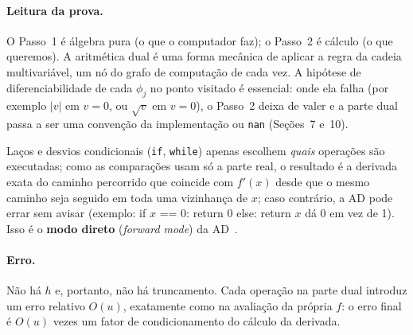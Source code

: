\documentclass[11pt,a4paper]{article}
\begin{document}
\paragraph{Leitura da prova.} O Passo~1 é álgebra pura (o que o computador faz); o Passo~2 é cálculo (o que queremos). A aritmética dual é uma forma mecânica de aplicar a regra da cadeia multivariável, um nó do grafo de computação de cada vez. A hipótese de diferenciabilidade de cada $\phi_j$ no ponto visitado é essencial: onde ela falha (por exemplo $|v|$ em $v=0$, ou $\sqrt v$ em $v=0$), o Passo~2 deixa de valer e a parte dual passa a ser uma convenção da implementação ou \texttt{nan} (Seções~7 e~10).

Laços e desvios condicionais (\texttt{if}, \texttt{while}) apenas escolhem \emph{quais} operações são executadas; como as comparações usam só a parte real, o resultado é a derivada exata do caminho percorrido que coincide com $f'(x)$ desde que o mesmo caminho seja seguido em toda uma vizinhança de $x$; caso contrário, a AD pode errar sem avisar (exemplo: if $x$ == 0: return 0 else: return $x$ dá 0 em vez de 1). Isso é o \textbf{modo direto} (\emph{forward mode}) da AD~\cite{baydin2018}.

\paragraph{Erro.} Não há $h$ e, portanto, não há truncamento. Cada operação na parte dual introduz um erro relativo $O(u)$, exatamente como na avaliação da própria $f$: o erro final é $O(u)$ vezes um fator de condicionamento do cálculo da derivada.
\end{document}
